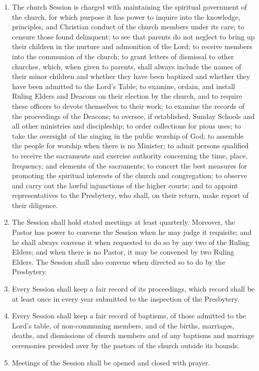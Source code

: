 \documentclass[
]{book}
\begin{document}
\begin{enumerate}
\item
  \protect\hypertarget{14.5}{\href{}{}}The church Session is charged with maintaining the spiritual government of the church, for which purpose it has power to inquire into the knowledge, principles, and Christian conduct of the church members under its care; to censure those found delinquent; to see that parents do not neglect to bring up their children in the nurture and admonition of the Lord; to receive members into the communion of the church; to grant letters of dismissal to other churches, which, when given to parents, shall always include the names of their minor children and whether they have been baptized and whether they have been admitted to the Lord's Table; to examine, ordain, and install Ruling Elders and Deacons on their election by the church, and to require these officers to devote themselves to their work; to examine the records of the proceedings of the Deacons; to oversee, if established, Sunday Schools and all other ministries and discipleship; to order collections for pious uses; to take the oversight of the singing in the public worship of God; to assemble the people for worship when there is no Minister; to admit persons qualified to receive the sacraments and exercise authority concerning the time, place, frequency, and elements of the sacraments; to concert the best measures for promoting the spiritual interests of the church and congregation; to observe and carry out the lawful injunctions of the higher courts; and to appoint representatives to the Presbytery, who shall, on their return, make report of their diligence.
\item
  The Session shall hold stated meetings at least quarterly. Moreover, the Pastor has power to convene the Session when he may judge it requisite; and he shall always convene it when requested to do so by any two of the Ruling Elders; and when there is no Pastor, it may be convened by two Ruling Elders. The Session shall also convene when directed so to do by the Presbytery.
\item
  Every Session shall keep a fair record of its proceedings, which record shall be at least once in every year submitted to the inspection of the Presbytery.
\item
  Every Session shall keep a fair record of baptisms, of those admitted to the Lord's table, of non-communing members, and of the births, marriages, deaths, and dismissions of church members and of any baptisms and marriage ceremonies presided over by the pastors of the church outside its bounds.
\item
  Meetings of the Session shall be opened and closed with prayer.
\end{enumerate}
\end{document}
